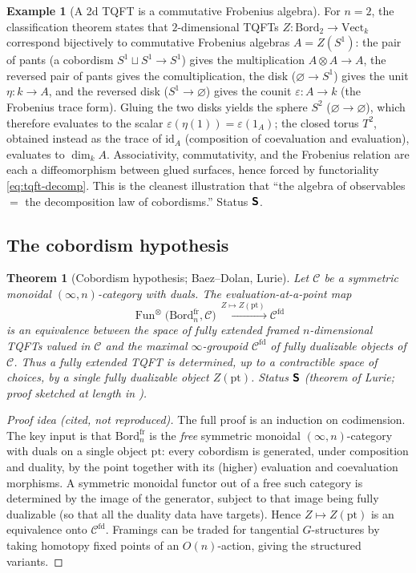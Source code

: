 \documentclass[12pt]{article}
\newtheorem{theorem}{Theorem}[section]
\theoremstyle{definition}
\newtheorem{example}[example]{Example}
\theoremstyle{remark}
\newcommand{\Bord}{\mathrm{Bord}}
\newcommand{\Vect}{\mathrm{Vect}}
\newcommand{\id}{\mathrm{id}}
\newcommand{\sfd}{^{\mathrm{fd}}}
\newcommand{\Sfont}{\textnormal{\sffamily\bfseries S}}
\begin{document}
\begin{example}[A 2d TQFT is a commutative Frobenius algebra]
\label{ex:2d-tqft}
For $n=2$, the classification theorem states that $2$-dimensional TQFTs
$Z\colon\Bord_2\to\Vect_k$ correspond bijectively to commutative Frobenius
algebras $A=Z(S^1)$: the pair of pants (a cobordism $S^1\sqcup S^1\to S^1$) gives
the multiplication $A\otimes A\to A$, the reversed pair of pants gives the
comultiplication, the disk ($\varnothing\to S^1$) gives the unit
$\eta\colon k\to A$, and the reversed disk ($S^1\to\varnothing$) gives the counit
$\varepsilon\colon A\to k$ (the Frobenius trace form). Gluing the two disks yields
the sphere $S^2$ ($\varnothing\to\varnothing$), which therefore evaluates to the
scalar $\varepsilon(\eta(1))=\varepsilon(1_A)$; the closed torus $T^2$, obtained
instead as the trace of $\id_A$ (composition of coevaluation and evaluation),
evaluates to $\dim_k A$. Associativity, commutativity, and the
Frobenius relation are
each a diffeomorphism between glued surfaces, hence forced by functoriality
\eqref{eq:tqft-decomp}. This is the cleanest illustration that ``the algebra of
observables $=$ the decomposition law of cobordisms.'' Status $\Sfont$.
\end{example}

\subsection{The cobordism hypothesis}

\begin{theorem}[Cobordism hypothesis; Baez--Dolan, Lurie]
\label{thm:cobordism-hyp}
Let $\mathcal{C}$ be a symmetric monoidal $(\infty,n)$-category with duals. The
evaluation-at-a-point map
\[
  \operatorname{Fun}^{\otimes}\bigl(\Bord_n^{\mathrm{fr}},\mathcal{C}\bigr)
  \xrightarrow{\ Z\mapsto Z(\mathrm{pt})\ }
  \mathcal{C}\sfd
\]
is an equivalence between the space of fully extended framed $n$-dimensional TQFTs
valued in $\mathcal{C}$ and the maximal $\infty$-groupoid $\mathcal{C}\sfd$ of
\emph{fully dualizable} objects of $\mathcal{C}$. Thus a fully extended TQFT is
determined, up to a contractible space of choices, by a single fully dualizable
object $Z(\mathrm{pt})$. Status $\Sfont$ (theorem of Lurie; proof sketched at
length in \cite{Lurie2009}).
\end{theorem}

\begin{proof}[Proof idea (cited, not reproduced)]
The full proof \cite{Lurie2009} is an induction on codimension. The key input is
that $\Bord_n^{\mathrm{fr}}$ is the \emph{free} symmetric monoidal
$(\infty,n)$-category with duals on a single object $\mathrm{pt}$: every
cobordism is generated, under composition and duality, by the point together with
its (higher) evaluation and coevaluation morphisms. A symmetric monoidal functor
out of a free such category is determined by the image of the generator, subject
to that image being fully dualizable (so that all the duality data have targets).
Hence $Z\mapsto Z(\mathrm{pt})$ is an equivalence onto $\mathcal{C}\sfd$.
Framings can be traded for tangential $G$-structures by taking homotopy fixed
points of an $O(n)$-action, giving the structured variants.
\end{proof}
\end{document}
